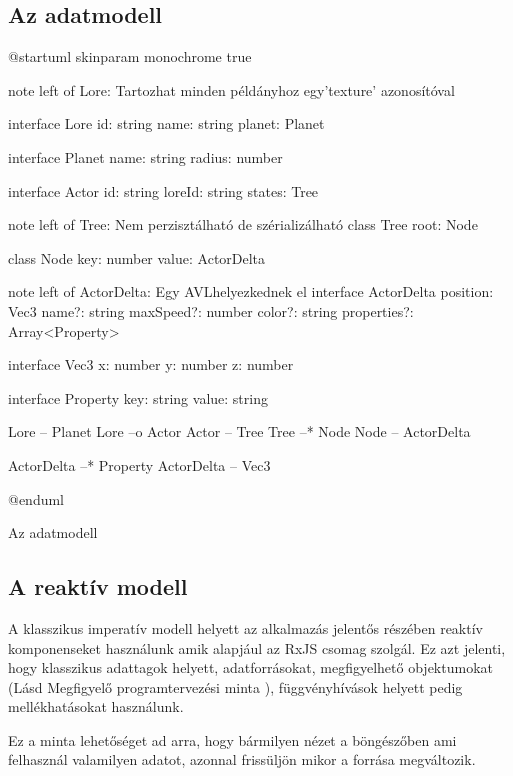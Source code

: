 \subsection{Az adatmodell}
\begin{plantuml}
@startuml
skinparam monochrome true

note left of Lore: Tartozhat minden példányhoz egy\nRxDocument 'texture' azonosítóval

interface Lore {
	id: string
	name: string
	planet: Planet
}

interface Planet {
	name: string
	radius: number
}

interface Actor {
	id: string
	loreId: string
	states: Tree
}

note left of Tree: Nem perzisztálható de szérializálható
class Tree {
	root: Node
}

class Node {
	key: number
	value: ActorDelta
}

note left of ActorDelta: Egy AVL helyezkednek el
interface ActorDelta {
	position: Vec3
	name?: string
	maxSpeed?: number
	color?: string
	properties?: Array<Property>
}

interface Vec3 {
	x: number
	y: number
	z: number
}

interface Property {
	key: string
	value: string
}

Lore -- Planet
Lore --o Actor
Actor -- Tree
Tree --* Node
Node -- ActorDelta

ActorDelta --* Property
ActorDelta -- Vec3

@enduml
\caption{Az adatmodell}
\label{fig:data-model}
\end{plantuml}

\subsection{A reaktív modell}

A klasszikus imperatív modell helyett az alkalmazás jelentős részében reaktív komponenseket használunk amik alapjául az RxJS \cite{RxJS} csomag szolgál. Ez azt jelenti, hogy klasszikus adattagok helyett, adatforrásokat, megfigyelhető objektumokat (Lásd Megfigyelő programtervezési minta \cite{ObserverPattern}), függvényhívások helyett pedig mellékhatásokat használunk.

Ez a minta lehetőséget ad arra, hogy bármilyen nézet a böngészőben ami felhasznál valamilyen adatot, azonnal frissüljön mikor a forrása megváltozik.

